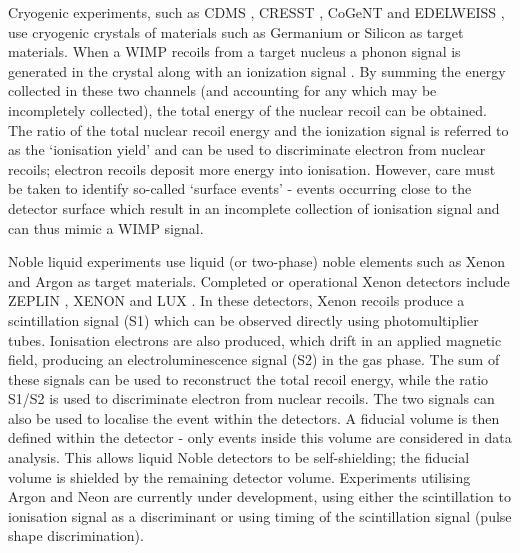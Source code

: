 Cryogenic experiments, such as CDMS \cite{Ahmed:2009,Ahmed:2011,Agnese:2013}, CRESST \cite{Angloher:2012}, CoGeNT \cite{Aalseth:2011a,Aalseth:2011b, Aalseth:2013,Aalseth:2014a,Aalseth:2014b} and EDELWEISS \cite{Armengaud:2011}, use cryogenic crystals of materials such as Germanium or Silicon as target materials. When a WIMP recoils from a target nucleus a phonon signal is generated in the crystal along with an ionization signal . By summing the energy collected in these two channels (and accounting for any which may be incompletely collected), the total energy of the nuclear recoil can be obtained. The ratio of the total nuclear recoil energy and the ionization signal is referred to as the `ionisation yield' and can be used to discriminate electron from nuclear recoils; electron recoils deposit more energy into ionisation. However, care must be taken to identify so-called `surface events' - events occurring close to the detector surface which result in an incomplete collection of ionisation signal and can thus mimic a WIMP signal.

Noble liquid experiments use liquid (or two-phase) noble elements such as Xenon and Argon as target materials. Completed or operational Xenon detectors include ZEPLIN \cite{Akimov:2012}, XENON \cite{Aprile:2011} and LUX \cite{Akerib:2014}. In these detectors, Xenon recoils produce a scintillation signal (S1) which can be observed directly using photomultiplier tubes. Ionisation electrons are also produced, which drift in an applied magnetic field, producing an electroluminescence signal (S2) in the gas phase. The sum of these signals can be used to reconstruct the total recoil energy, while the ratio S1/S2 is used to discriminate electron from nuclear recoils.  The two signals can also be used to localise the event within the detectors. A fiducial volume is then defined within the detector - only events inside this volume are considered in data analysis. This allows liquid Noble detectors to be self-shielding; the fiducial volume is shielded by the remaining detector volume. Experiments utilising Argon \cite{Marchionni:2011, Badertscher:2013} and Neon \cite{Boulay:2008} are currently under development, using either the scintillation to ionisation signal as a discriminant or using timing of the scintillation signal (pulse shape discrimination).

